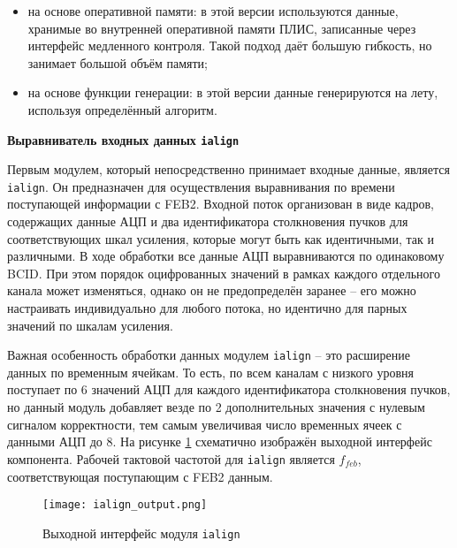 \begin{itemize}
    \item на основе оперативной памяти: в этой версии используются данные, хранимые во внутренней оперативной памяти ПЛИС, записанные через интерфейс медленного контроля. Такой подход даёт большую гибкость, но занимает большой объём памяти;
    \item на основе функции генерации: в этой версии данные генерируются на лету, используя определённый алгоритм.
\end{itemize}\par
\textbf{Выравниватель входных данных \texttt{ialign}}\par
Первым модулем, который непосредственно принимает входные данные, является \texttt{ialign}. Он предназначен для осуществления выравнивания по времени поступающей информации с FEB2. Входной поток организован в виде кадров, содержащих данные АЦП и два идентификатора столкновения пучков для соответствующих шкал усиления, которые могут быть как идентичными, так и различными. В ходе обработки все данные АЦП выравниваются по одинаковому BCID. При этом порядок оцифрованных значений в рамках каждого отдельного канала может изменяться, однако он не предопределён заранее -- его можно настраивать индивидуально для любого потока, но идентично для парных значений по шкалам усиления.\par
Важная особенность обработки данных модулем \texttt{ialign} -- это расширение данных по временным ячейкам. То есть, по всем каналам с низкого уровня поступает по 6 значений АЦП для каждого идентификатора столкновения пучков, но данный модуль добавляет везде по 2 дополнительных значения с нулевым сигналом корректности, тем самым увеличивая число временных ячеек с данными АЦП до 8. На рисунке \ref{fig:ialign_output} схематично изображён выходной интерфейс компонента. Рабочей тактовой частотой для \texttt{ialign} является $f_{feb}$, соответствующая поступающим с FEB2 данным.

\begin{figure}[ht]
    \centering
    \texttt{[image: ialign\_output.png]}
    \caption{Выходной интерфейс модуля \texttt{ialign}}
    \label{fig:ialign_output}
\end{figure}\par

